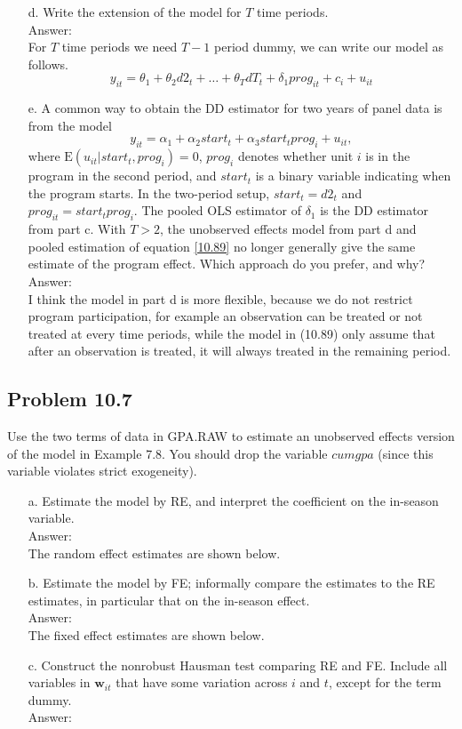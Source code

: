 \documentclass[10pt]{article}
\newcommand{\E}{\text{E}}
\begin{document}
\begin{enumerate}
\item[d.] Write the extension of the model for $T$ time periods.
\\ Answer: \\
For $T$ time periods we need $T-1$ period dummy, we can write our model as follows.
\[y_{it}=\theta_1+\theta_2d2_t+\ldots+\theta_T dT_t+\delta_1prog_{it}+c_i+u_{it}\]

\item[e.] A common way to obtain the DD estimator for two years of panel data is from the model
\[y_{it}=\alpha_1+\alpha_2 start_t+\alpha_3 start_t prog_i+u_{it}, \tag{10.89}\label{10.89}\]
where $\E(u_{it}|start_t,prog_i)=0$, $prog_i$ denotes whether unit $i$ is in the program in the second period, and $start_t$ is a binary variable indicating when the program starts. In the two-period setup, $start_t=d2_t$ and $prog_{it}=start_t prog_i$. The pooled OLS estimator of $\delta_1$ is the DD estimator from part c. With $T>2$, the unobserved effects model from part d and pooled estimation of equation \eqref{10.89} no longer generally give the same estimate of the program effect. Which approach do you prefer, and why?
\\ Answer: \\
I think the model in part d is more flexible, because we do not restrict program participation, for example an observation can be treated or not treated at every time periods, while the model in (10.89) only assume that after an observation is treated, it will always treated in the remaining period.

\end{enumerate}

\subsection*{Problem 10.7}
Use the two terms of data in GPA.RAW to estimate an unobserved effects version of the model in Example 7.8. You should drop the variable $cumgpa$ (since this variable violates strict exogeneity).
\begin{enumerate}
\item[a.] Estimate the model by RE, and interpret the coefficient on the in-season variable. 
\\ Answer: \\
The random effect estimates are shown below.

\item[b.] Estimate the model by FE; informally compare the estimates to the RE estimates, in particular that on the in-season effect. 
\\ Answer: \\
The fixed effect estimates are shown below.

\item[c.] Construct the nonrobust Hausman test comparing RE and FE. Include all variables in $\textbf{w}_{it}$ that have some variation across $i$ and $t$, except for the term dummy.
\\ Answer: \\ \\
\end{enumerate}
\end{document}
